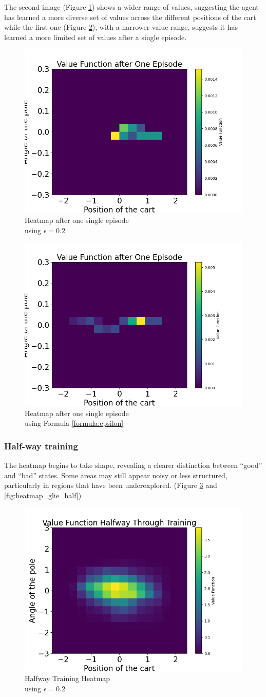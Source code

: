 \documentclass{article}
\begin{document}
The second image (Figure \ref{fig:heatmap_costant_init}) shows a wider range of values, suggesting the agent has learned a more diverse set of values across the different positions of the cart while the first one (Figure \ref{fig:heatmap_glie_init}), with a narrower value range, suggests it has learned a more limited set of values after a single episode.

\begin{figure}[h]
	\centering
	\includegraphics[height=0.28\linewidth]{../data/plot/heatmap_after_one_episode_constant_0.2.png}
	\caption{Heatmap after one single episode \\ using $\epsilon = 0.2$}
	\label{fig:heatmap_costant_init}
\end{figure}

\begin{figure}[h]
	\centering
	\includegraphics[height=0.28\linewidth]{../data/plot/heatmap_after_one_episode_glie.png}
	\caption{Heatmap after one single episode \\ using Formula \ref{formula:epsilon}}
	\label{fig:heatmap_glie_init}
\end{figure}

\newpage
\subsubsection{Half-way training}
The heatmap begins to take shape, revealing a clearer distinction between “good” and “bad” states. Some areas may still appear noisy or less structured, particularly in regions that have been underexplored. (Figure \ref{fig:heatmap_costant_half}
and \ref{fig:heatmap_glie_half})

\begin{figure}[h]
		\centering
		\includegraphics[height=0.28\linewidth]{../data/plot/heatmap_halfway_constant_0.2.png}
		\caption{Halfway Training Heatmap  \\ using $\epsilon = 0.2$}
		\label{fig:heatmap_costant_half}
\end{figure}
\end{document}
